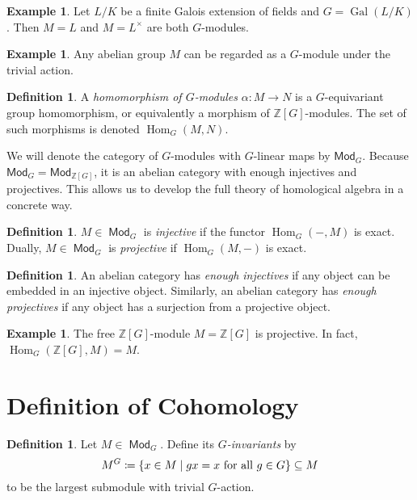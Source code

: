 \documentclass[leqno, openany]{memoir}
\theoremstyle{definition}
\newtheorem{defn}[thm]{Definition}
\newtheorem{exm}[thm]{Example}
\theoremstyle{remark}
\theoremstyle{plain}
\theoremstyle{definition}
\theoremstyle{remark}
\newcommand{\Z}{\mathbb{Z}}
\newcommand{\ms}[1]{\mathsf{#1}}
\DeclareMathOperator{\Hom}{Hom}
\DeclareMathOperator{\Gal}{Gal}
\DeclareMathOperator{\Mod}{\mathsf{Mod}}
\begin{document}
\begin{exm}
    Let $L/K$ be a finite Galois extension of fields and $G = \Gal(L/K)$. Then $M = L$ and $M = L^{\times}$ are both $G$-modules.
\end{exm}

\begin{exm}
    Any abelian group $M$ can be regarded as a $G$-module under the trivial action.
\end{exm}

\begin{defn}
    A \textit{homomorphism of $G$-modules} $\alpha \colon M \to N$ is a $G$-equivariant group homomorphism, or equivalently a morphism of $\Z[G]$-modules. The set of such morphisms is denoted $\Hom_G(M,N)$.
\end{defn}

We will denote the category of $G$-modules with $G$-linear maps by $\ms{Mod}_G$. Because $\ms{Mod}_G = \ms{Mod}_{\Z[G]}$, it is an abelian category with enough injectives and projectives. This allows us to develop the full theory of homological algebra in a concrete way.

\begin{defn}
    $M \in \Mod_G$ is \textit{injective} if the functor $\Hom_G(-,M)$ is exact. Dually, $M \in \Mod_G$ is \textit{projective} if $\Hom_G(M,-)$ is exact.
\end{defn}

\begin{defn}
    An abelian category has \textit{enough injectives} if any object can be embedded in an injective object. Similarly, an abelian category has \textit{enough projectives} if any object has a surjection from a projective object.
\end{defn}

\begin{exm}
    The free $\Z[G]$-module $M = \Z[G]$ is projective. In fact, $\Hom_G(\Z[G], M) = M$.
\end{exm}

\section{Definition of Cohomology}%
\label{sec:definition_of_cohomology}

\begin{defn}
    Let $M \in \Mod_G$. Define its \textit{$G$-invariants} by 
    \[ M^G \coloneqq \qty{ x \in M \mid gx = x\ \text{for all}\ g \in G } \subseteq M \]
    to be the largest submodule with trivial $G$-action.
\end{defn}
\end{document}
